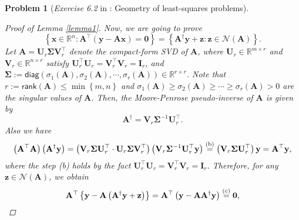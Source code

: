 \documentclass[11pt]{article}
\newtheorem{problem}{Problem}
\numberwithin{equation}{problem}
\begin{document}
\begin{problem} [\emph{Exercise 6.2} in \cite{calafiore2014optimization}: Geometry of least-squares problems]
{\begin{proof} [Proof of Lemma \ref{lemma1}]
\indent Now, we are going to prove
\begin{equation}
    \label{eqn2.5}
    \left\{ \mathbf{x} \in \mathbb{R}^n : \mathbf{A}^{\top} \left( \mathbf{y} - \mathbf{A} \mathbf{x} \right) = \mathbf{0} \right\} 
    = \left\{ \mathbf{A}^{\dagger} \mathbf{y} + \mathbf{z} : \mathbf{z} \in \mathcal{N} (\mathbf{A}) \right\}.
\end{equation}
Let $\mathbf{A} = \mathbf{U}_r \mathbf{\Sigma} \mathbf{V}_{r}^{\top}$ denote the compact-form \textsf{SVD} of $\mathbf{A}$, where $\mathbf{U}_r \in \mathbb{R}^{m \times r}$ and $\mathbf{V}_r \in \mathbb{R}^{n \times r}$ satisfy $\mathbf{U}_{r}^{\top} \mathbf{U}_r = \mathbf{V}_{r}^{\top} \mathbf{V}_r = \mathbf{I}_r$, and $\mathbf{\Sigma} := \textsf{diag} \left( \sigma_1 (\mathbf{A}), \sigma_2 (\mathbf{A}), \cdots, \sigma_r (\mathbf{A}) \right) \in \mathbb{R}^{r \times r}$. Note that $r := \textsf{rank}(\mathbf{A}) \leq \min \left\{ m, n \right\}$ and $\sigma_1 (\mathbf{A}) \geq \sigma_2 (\mathbf{A}) \geq \cdots \geq \sigma_r (\mathbf{A}) > 0$ are the singular values of $\mathbf{A}$. Then, the Moore-Penrose pseudo-inverse of $\mathbf{A}$ is given by
\begin{equation*}
    \mathbf{A}^{\dagger} = \mathbf{V}_r \mathbf{\Sigma}^{-1} \mathbf{U}_{r}^{\top}.
\end{equation*}
Also we have
\begin{equation}
    \label{eqn2.6}
    \left( \mathbf{A}^{\top} \mathbf{A} \right) \left( \mathbf{A}^{\dagger} \mathbf{y} \right)
    = \left( \mathbf{V}_r \mathbf{\Sigma} \mathbf{U}_{r}^{\top} \cdot \mathbf{U}_r \mathbf{\Sigma} \mathbf{V}_{r}^{\top} \right) \left( \mathbf{V}_r \mathbf{\Sigma}^{-1} \mathbf{U}_{r}^{\top} \mathbf{y} \right) 
    \stackrel{\textnormal{(b)}}{=} \left( \mathbf{V}_r \mathbf{\Sigma} \mathbf{U}_{r}^{\top} \right) \mathbf{y} = \mathbf{A}^{\top} \mathbf{y},
\end{equation}
where the step (b) holds by the fact $\mathbf{U}_{r}^{\top} \mathbf{U}_r = \mathbf{V}_{r}^{\top} \mathbf{V}_r = \mathbf{I}_r$. Therefore, for any $\mathbf{z} \in \mathcal{N} (\mathbf{A})$, we obtain
\begin{equation*}
    \begin{split}
        \mathbf{A}^{\top} \left\{ \mathbf{y} - \mathbf{A} \left( \mathbf{A}^{\dagger} \mathbf{y} + \mathbf{z} \right) \right\}
        = \mathbf{A}^{\top} \left( \mathbf{y} - \mathbf{A} \mathbf{A}^{\dagger} \mathbf{y} \right)
        \stackrel{\textnormal{(c)}}{=} \mathbf{0},
    \end{split}

\end{equation*}
\end{proof}}
\end{problem}
\end{document}

